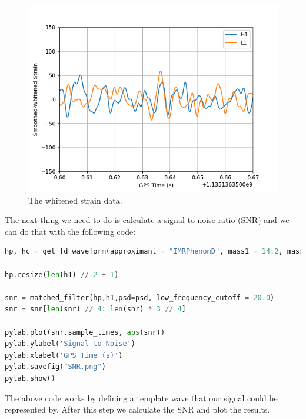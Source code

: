 \documentclass[]{article}
\begin{document}
\begin{figure}[H]
	\begin{center}
		\includegraphics[scale=1]{WhitenStrain.png}
	\end{center}
	\caption{The whitened strain data.}
	\label{fig:whitedata}
\end{figure}

The next thing we need to do is calculate a signal-to-noise ratio (SNR) and we can do that with the following code:

\begin{lstlisting}[language = Python]
hp, hc = get_fd_waveform(approximant = "IMRPhenomD", mass1 = 14.2, mass2 = 7.5, f_lower = 20, delta_f = 1.0/h1.duration)

hp.resize(len(h1) // 2 + 1)

snr = matched_filter(hp,h1,psd=psd, low_frequency_cutoff = 20.0)
snr = snr[len(snr) // 4: len(snr) * 3 // 4]

pylab.plot(snr.sample_times, abs(snr))
pylab.ylabel('Signal-to-Noise')
pylab.xlabel('GPS Time (s)')
pylab.savefig("SNR.png")
pylab.show()
\end{lstlisting}

The above code works by defining a template wave that our signal could be represented by. After this step we calculate the SNR and plot the results.
\end{document}
